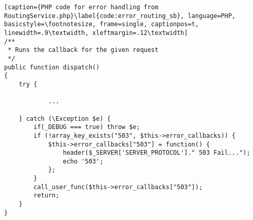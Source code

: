 \clearpage
\begin{lstlisting}[caption={PHP code for error handling from RoutingService.php}\label{code:error_routing_sb}, language=PHP, basicstyle=\footnotesize, frame=single, captionpos=t, linewidth=.9\textwidth, xleftmargin=.12\textwidth]
/**
 * Runs the callback for the given request
 */
public function dispatch()
{
    try {

            ...

    } catch (\Exception $e) {
        if(_DEBUG === true) throw $e;
        if (!array_key_exists("503", $this->error_callbacks)) {
            $this->error_callbacks["503"] = function() {
                header($_SERVER['SERVER_PROTOCOL']." 503 Fail...");
                echo '503';
            };
        }
        call_user_func($this->error_callbacks["503"]);
        return;
    }
}
\end{lstlisting}
\clearpage